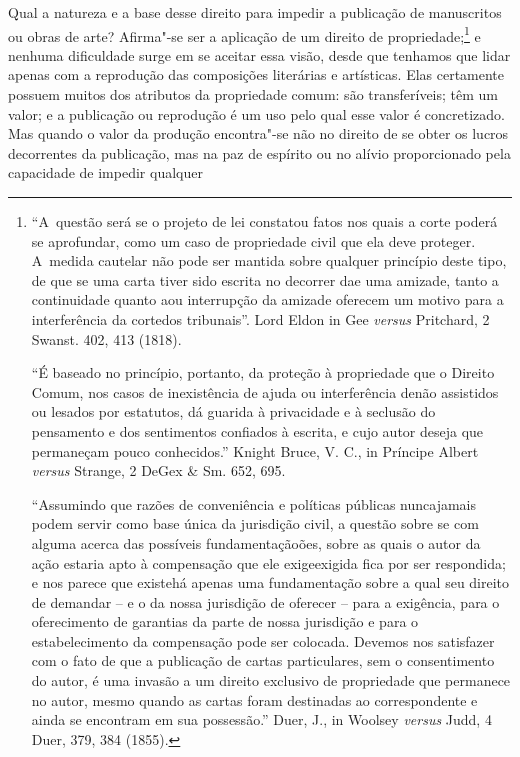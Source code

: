Qual a natureza e a base desse direito para impedir a publicação de
manuscritos ou obras de arte? Afirma"-se ser a aplicação de um direito de
propriedade;\footnote{``A~questão será se o projeto de lei constatou
  fatos nos quais a corte poderá se aprofundar, como um caso de
  propriedade civil que ela deve proteger. A~medida cautelar não pode
  ser mantida sobre qualquer princípio deste tipo, de que se uma carta
  tiver sido escrita no decorrer dae uma amizade, tanto a continuidade
  quanto aou interrupção da amizade oferecem um motivo para a
  interferência da cortedos tribunais''. Lord Eldon in Gee \emph{versus}
  Pritchard, 2 Swanst. 402, 413 (1818).

  ``É baseado no princípio, portanto, da proteção à propriedade que o
  Direito Comum, nos casos de inexistência de ajuda ou interferência
  denão assistidos ou lesados por estatutos, dá guarida à privacidade e
  à seclusão do pensamento e dos sentimentos confiados à escrita, e cujo
  autor deseja que permaneçam pouco conhecidos.'' Knight Bruce, V. C.,
  in Príncipe Albert \emph{versus} Strange, 2 DeGex \& Sm. 652, 695.

  ``Assumindo que razões de conveniência e políticas públicas
  nuncajamais podem servir como base única da jurisdição civil, a
  questão sobre se com alguma acerca das possíveis fundamentaçãoões,
  sobre as quais o autor da ação estaria apto à compensação que ele
  exigeexigida fica por ser respondida; e nos parece que existehá apenas
  uma fundamentação sobre a qual seu direito de demandar -- e o da nossa
  jurisdição de oferecer -- para a exigência, para o oferecimento de
  garantias da parte de nossa jurisdição e para o estabelecimento da
  compensação pode ser colocada. Devemos nos satisfazer com o fato de
  que a publicação de cartas particulares, sem o consentimento do autor,
  é uma invasão a um direito exclusivo de propriedade que permanece no
  autor, mesmo quando as cartas foram destinadas ao correspondente e
  ainda se encontram em sua possessão.'' Duer, J., in Woolsey
  \emph{versus} Judd, 4 Duer, 379, 384 (1855).} e nenhuma dificuldade
surge em se aceitar essa visão, desde que tenhamos que lidar apenas com
a reprodução das composições literárias e artísticas. Elas certamente
possuem muitos dos atributos da propriedade comum: são transferíveis;
têm um valor; e a publicação ou reprodução é um uso pelo qual esse valor
é concretizado. Mas quando o valor da produção encontra"-se não no
direito de se obter os lucros decorrentes da publicação, mas na paz de
espírito ou no alívio proporcionado pela capacidade de impedir qualquer
